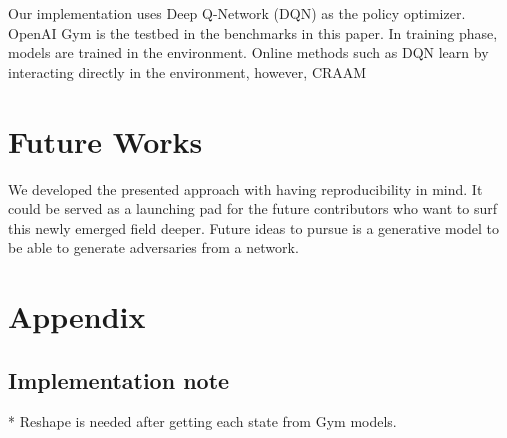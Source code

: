 \documentclass{article}
\begin{document}
    Our implementation uses Deep Q-Network (DQN)\cite{Mnih2015} as the policy optimizer. OpenAI Gym \cite{Brockman2016} is the testbed in the benchmarks in this paper. In training phase, models are trained in the environment. Online methods such as DQN learn by interacting directly in the environment, however, CRAAM




    \section{Future Works}
    We developed the presented approach with having reproducibility in mind. It could be served as a launching pad for the future contributors who want to surf this newly emerged field deeper. Future ideas to pursue is a generative model to be able to generate adversaries from a network.

    \section*{Appendix}

    \subsection{Implementation note}
    * Reshape is needed after getting each state from Gym models.




    
    





\end{document}
